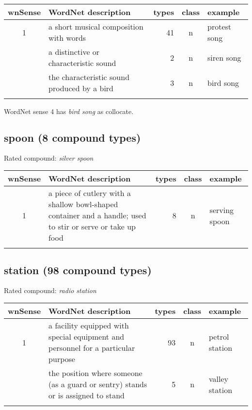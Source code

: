 \noindent
\begin{longtable}{c>{\raggedright\arraybackslash}p{5cm}rc>{\raggedright\arraybackslash}p{2cm}}\lsptoprule
{\small wnSense}&WordNet description&types&class&example\\\midrule
1&a short musical composition with words&41&n&protest song\\\tablevspace
2&a distinctive or characteristic sound&2&n&siren song\\\tablevspace
4&the characteristic sound produced by a bird&3&n&bird song\\\lspbottomrule
\end{longtable}
\vspace*{-.2cm}

\noindent
WordNet sense 4 has \emph{bird song} as collocate.
\subsection{spoon    (8 compound types)}
Rated compound: \emph{silver spoon}


\vspace*{-.2cm}

\noindent
\begin{longtable}{c>{\raggedright\arraybackslash}p{5cm}rc>{\raggedright\arraybackslash}p{2cm}}\lsptoprule
{\small wnSense}&WordNet description&types&class&example\\\midrule
1&a piece of cutlery with a shallow bowl-shaped container and a handle; used to stir or serve or take up food&8&n&serving spoon\\\lspbottomrule
\end{longtable}

\subsection{station   (98 compound types)}
Rated compound: \emph{radio station}

\vspace*{-.2cm}

\noindent
\begin{longtable}{c>{\raggedright\arraybackslash}p{5cm}rc>{\raggedright\arraybackslash}p{2cm}}\lsptoprule
{\small wnSense}&WordNet description&types&class&example\\\midrule
1&a facility equipped with special equipment and personnel for a particular purpose&93&n&petrol station\\\tablevspace
4&the position where someone (as a guard or sentry) stands or is assigned to stand&5&n&valley station\\\lspbottomrule
\end{longtable}
